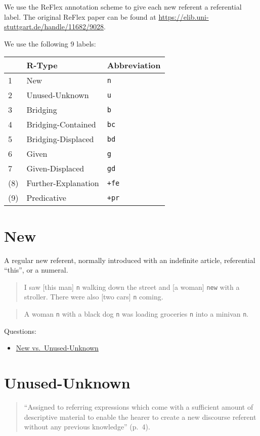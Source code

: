 \documentclass[
]{book}
\providecommand{\tightlist}{%
  \setlength{\itemsep}{0pt}\setlength{\parskip}{0pt}}
\begin{document}
We use the ReFlex annotation scheme to give each new referent a referential label.
The original ReFlex paper can be found at \url{https://elib.uni-stuttgart.de/handle/11682/9028}.

We use the following 9 labels:

\begin{longtable}[]{@{}lll@{}}
\toprule
& R-Type & Abbreviation\tabularnewline
\midrule
\endhead
1 & New & \texttt{n}\tabularnewline
2 & Unused-Unknown & \texttt{u}\tabularnewline
3 & Bridging & \texttt{b}\tabularnewline
4 & Bridging-Contained & \texttt{bc}\tabularnewline
5 & Bridging-Displaced & \texttt{bd}\tabularnewline
6 & Given & \texttt{g}\tabularnewline
7 & Given-Displaced & \texttt{gd}\tabularnewline
(8) & Further-Explanation & \texttt{+fe}\tabularnewline
(9) & Predicative & \texttt{+pr}\tabularnewline
\bottomrule
\end{longtable}

\hypertarget{new}{%
\section{New}\label{new}}

A regular new referent, normally introduced with an indefinite article, referential ``this'', or a numeral.

\begin{quote}
I saw {[}this man{]} \texttt{n} walking down the street and {[}a woman{]} \texttt{new} with a stroller.
There were also {[}two cars{]} \texttt{n} coming.
\end{quote}

\begin{quote}
A woman \texttt{n} with a black dog \texttt{n} was loading groceries \texttt{n} into a minivan \texttt{n}.
\end{quote}

Questions:

\begin{itemize}
\tightlist
\item
  \protect\hyperlink{new-vs.-unused-unknown}{New vs.~Unused-Unknown}
\end{itemize}

\hypertarget{unused-unknown}{%
\section{Unused-Unknown}\label{unused-unknown}}

\begin{quote}
``Assigned to referring expressions which come with a sufficient amount of descriptive material to enable the hearer to create a new discourse referent without any previous knowledge'' (p.~4).
\end{quote}
\end{document}
